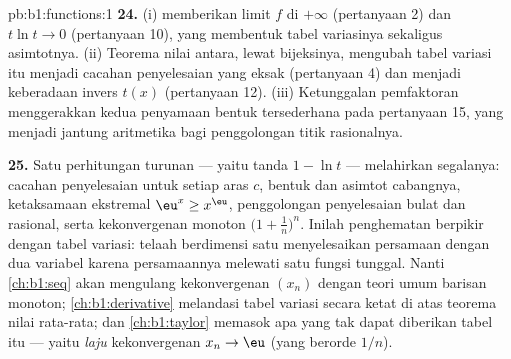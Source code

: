 \begin{solution}{pb:b1:functions:1}
\textbf{24.} (i)  memberikan limit $f$ di
$+\infty$ (pertanyaan 2) dan $t\ln t \to 0$ (pertanyaan 10),
yang membentuk tabel variasinya sekaligus asimtotnya. (ii) Teorema
nilai antara, lewat  bijeksinya,
mengubah tabel variasi itu menjadi cacahan penyelesaian yang eksak
(pertanyaan 4) dan menjadi keberadaan  invers $t(x)$
(pertanyaan 12). (iii) Ketunggalan pemfaktoran menggerakkan kedua
penyamaan bentuk tersederhana pada pertanyaan 15, yang menjadi jantung aritmetika
bagi penggolongan titik rasionalnya.

\textbf{25.} Satu perhitungan turunan --- yaitu tanda $1 - \ln
t$ --- melahirkan segalanya: cacahan penyelesaian untuk setiap aras
$c$, bentuk dan asimtot cabangnya, ketaksamaan
ekstremal $\eu^x \geq x^\eu$, penggolongan penyelesaian bulat dan
rasional, serta kekonvergenan monoton $\bigl(1 +
\frac1n\bigr)^n$. Inilah penghematan berpikir dengan tabel
variasi: telaah berdimensi satu menyelesaikan persamaan dengan dua variabel
karena persamaannya melewati satu fungsi tunggal.
Nanti \cref{ch:b1:seq} akan mengulang kekonvergenan $(x_n)$ dengan
teori umum barisan monoton; \cref{ch:b1:derivative}
melandasi tabel variasi secara ketat di atas teorema nilai rata-rata; dan
\cref{ch:b1:taylor} memasok apa yang tak dapat diberikan tabel itu --- yaitu
\emph{laju} kekonvergenan $x_n \to \eu$ (yang berorde
$1/n$).

\end{solution}
